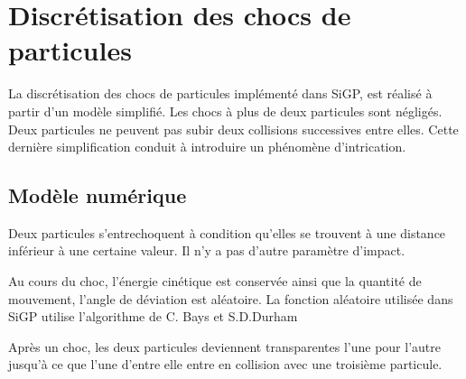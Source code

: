 
\section{Discrétisation des chocs de particules}
%
La discrétisation des chocs de particules implémenté dans SiGP, est réalisé à partir d'un modèle simplifié. Les chocs à plus de deux particules sont négligés. Deux particules ne peuvent pas subir deux collisions successives entre elles. Cette dernière simplification conduit à introduire un phénomène d'intrication.
%
\subsection{Modèle numérique}
\label{joseph}
%
Deux particules s'entrechoquent à condition qu'elles se trouvent à une distance inférieur à une certaine valeur. Il n'y a pas d'autre paramètre d'impact.

Au cours du choc, l'énergie cinétique est conservée ainsi que la quantité de mouvement, l'angle de déviation est aléatoire. La fonction aléatoire utilisée dans SiGP utilise l'algorithme de C. Bays et S.D.Durham \cite{aleatoire1}

Après un choc, les deux particules deviennent transparentes l'une pour l'autre jusqu'à ce que l'une d'entre elle entre en collision avec une troisième particule.
%
